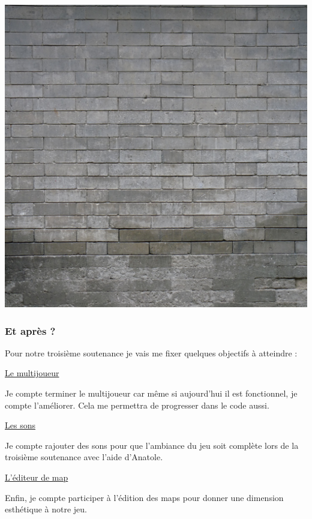 \documentclass{article}
\begin{document}
\begin{center}
\includegraphics[scale=0.5]{mur_brique.png}
\end{center}
\subsubsection{Et après ?}
\par
Pour notre troisième soutenance je vais me fixer quelques objectifs à atteindre :
\newline

\par
\underline{Le multijoueur}
\newline
\par
Je compte terminer le multijoueur car même si aujourd'hui il est fonctionnel, je compte l'améliorer. Cela me permettra de progresser dans le code aussi.
\newline

\par
\underline{Les sons}
\newline
\par
Je compte rajouter des sons pour que l'ambiance du jeu soit complète lors de la troisième soutenance avec l’aide d’Anatole.
\newline

\par
\underline{L'éditeur de map}
\newline
\par
Enfin, je compte participer à l'édition des maps pour donner une dimension esthétique à notre jeu.
\newline
\end{document}
